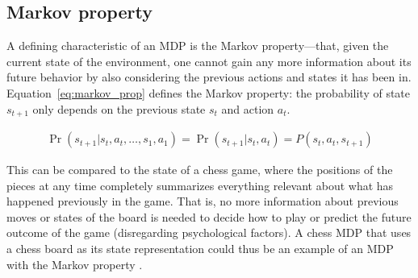 \subsection{Markov property}

A defining characteristic of an MDP is the Markov property---that, given the
current state of the environment, one cannot gain any more information about
its future behavior by also considering the previous actions and states it has
been in. Equation~\eqref{eq:markov_prop} defines the Markov property: the
probability of state $s_{t+1}$ only depends on the previous state $s_t$ and
action $a_t$.

\begin{align}
\label{eq:markov_prop}
\Pr(s_{t+1} | s_t, a_t, \ldots, s_1, a_1) 
  = \Pr(s_{t+1} | s_t, a_t) 
  = P(s_t, a_t, s_{t+1})
\end{align}

This can be compared to the state of a chess game, where the positions
of the pieces at any time completely summarizes everything relevant about what
has happened previously in the game. That is, no more information about
previous moves or states of the board is needed to decide how to play or
predict the future outcome of the game (disregarding psychological factors). A
chess MDP that uses a chess board as its state representation could thus be an
example of an MDP with the Markov property \parencite{altman2002applications}. 
